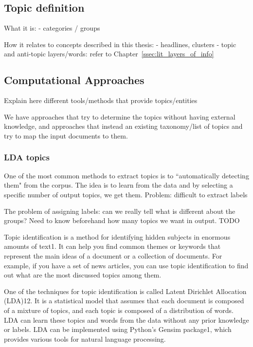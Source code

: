 \subsection{Topic definition}
\label{sec:lit_topics_def}

What it is:
- categories / groups 

How it relates to concepts described in this thesis:
- headlines, clusters
- topic and anti-topic layers/words: refer to Chapter~\ref{ssec:lit_layers_of_info}

\subsection{Computational Approaches}
\label{sec:lit_topics_computation}


Explain here different tools/methods that provide topics/entities

We have approaches that try to determine the topics without having external knowledge, and approaches that instead an existing taxonomy/list of topics and try to map the input documents to them.

\subsubsection{LDA topics}

One of the most common methods to extract topics is to ``automatically detecting them" from the corpus.
The idea is to learn from the data and by selecting a specific number of output topics, we get them.
Problem: difficult to extract labels

The problem of assigning labels: can we really tell what is different about the groups?
Need to know beforehand how many topics we want in output.
TODO

Topic identification is a method for identifying hidden subjects in enormous amounts of text1. It can help you find common themes or keywords that represent the main ideas of a document or a collection of documents. For example, if you have a set of news articles, you can use topic identification to find out what are the most discussed topics among them.

One of the techniques for topic identification is called Latent Dirichlet Allocation (LDA)12. It is a statistical model that assumes that each document is composed of a mixture of topics, and each topic is composed of a distribution of words. LDA can learn these topics and words from the data without any prior knowledge or labels. LDA can be implemented using Python’s Gensim package1, which provides various tools for natural language processing.

